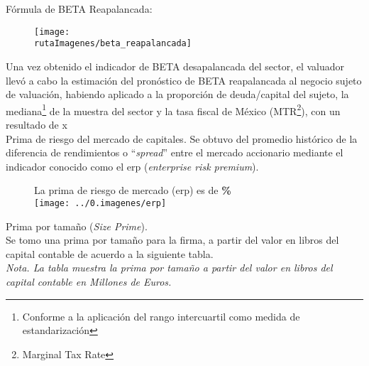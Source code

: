 F\'ormula de BETA Reapalancada:\\

\begin{figure}[H]
\centering
\texttt{[image: \\rutaImagenes/beta\_reapalancada]}
\end{figure}

Una vez obtenido el indicador de BETA desapalancada del sector, el valuador llev\'o a cabo la estimaci\'on del pron\'ostico de BETA reapalancada al negocio sujeto de valuaci\'on, habiendo aplicado a la proporci\'on de deuda/capital del sujeto, la mediana\footnote{Conforme a la aplicaci\'on del rango intercuartil como medida de estandarizaci\'on}  de la muestra del sector y la tasa fiscal de M\'exico (MTR\footnote{Marginal Tax Rate}), con un resultado de \textcolor{principal}{\betaReapalancada x}\\



\textcolor{principal}{Prima de riesgo del mercado de capitales}. Se obtuvo del promedio hist\'orico de la diferencia de rendimientos o ``\textit{spread}'' entre el mercado accionario \mercadoAccionario{} mediante el indicador conocido como el \gls{erp} (\textit{enterprise risk premium}).\\

\begin{figure}[H]
\centering
La prima de riesgo de mercado (\gls{erp}) es de \textbf{\textcolor{principal}{\erpValor\%}} \\[10pt]

\texttt{[image: ../0.imagenes/erp]}
\end{figure}

%

\textcolor{principal}{Prima por tamaño (\textit{Size Prime}).} \\[5pt]

Se tomo una prima por tamaño para la firma, a partir del valor en libros del capital contable de acuerdo a la siguiente tabla.\\

\textit{Nota. La tabla muestra la prima por tamaño a partir del valor en libros del capital contable en Millones de Euros.%
}

